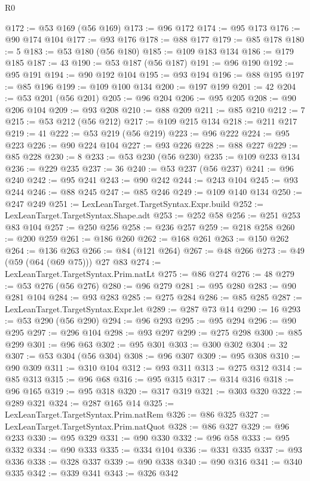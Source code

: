 \begin{lexlean}{R0}
\begin{coremodule}
@172 := @53 @169 (@56 @169)
@173 := @96 @172
@174 := @95 @173
@176 := @90 @174 @104
@177 := @93 @176
@178 := @88 @177
@179 := @85 @178
@180 := 5
@183 := @53 @180 (@56 @180)
@185 := @109 @183 @134
@186 := @179 @185
@187 := 43
@190 := @53 @187 (@56 @187)
@191 := @96 @190
@192 := @95 @191
@194 := @90 @192 @104
@195 := @93 @194
@196 := @88 @195
@197 := @85 @196
@199 := @109 @100 @134
@200 := @197 @199
@201 := 42
@204 := @53 @201 (@56 @201)
@205 := @96 @204
@206 := @95 @205
@208 := @90 @206 @104
@209 := @93 @208
@210 := @88 @209
@211 := @85 @210
@212 := 7
@215 := @53 @212 (@56 @212)
@217 := @109 @215 @134
@218 := @211 @217
@219 := 41
@222 := @53 @219 (@56 @219)
@223 := @96 @222
@224 := @95 @223
@226 := @90 @224 @104
@227 := @93 @226
@228 := @88 @227
@229 := @85 @228
@230 := 8
@233 := @53 @230 (@56 @230)
@235 := @109 @233 @134
@236 := @229 @235
@237 := 36
@240 := @53 @237 (@56 @237)
@241 := @96 @240
@242 := @95 @241
@243 := @90 @242
@244 := @243 @104
@245 := @93 @244
@246 := @88 @245
@247 := @85 @246
@249 := @109 @140 @134
@250 := @247 @249
@251 := LexLeanTarget.TargetSyntax.Expr.build
@252 := LexLeanTarget.TargetSyntax.Shape.adt
@253 := @252 @58
@256 := @251 @253 @83 @104
@257 := @250 @256
@258 := @236 @257
@259 := @218 @258
@260 := @200 @259
@261 := @186 @260
@262 := @168 @261
@263 := @150 @262
@264 := @136 @263
@266 := @84 (@121 @264)
@267 := @48 @266
@273 := @49 (@59 (@64 (@69 @75))) @27 @83
@274 := LexLeanTarget.TargetSyntax.Prim.natLt
@275 := @86 @274
@276 := 48
@279 := @53 @276 (@56 @276)
@280 := @96 @279
@281 := @95 @280
@283 := @90 @281 @104
@284 := @93 @283
@285 := @275 @284
@286 := @85 @285
@287 := LexLeanTarget.TargetSyntax.Expr.let
@289 := @287 @73 @14
@290 := 16
@293 := @53 @290 (@56 @290)
@294 := @96 @293
@295 := @95 @294
@296 := @90 @295
@297 := @296 @104
@298 := @93 @297
@299 := @275 @298
@300 := @85 @299
@301 := @96 @63
@302 := @95 @301
@303 := @300 @302
@304 := 32
@307 := @53 @304 (@56 @304)
@308 := @96 @307
@309 := @95 @308
@310 := @90 @309
@311 := @310 @104
@312 := @93 @311
@313 := @275 @312
@314 := @85 @313
@315 := @96 @68
@316 := @95 @315
@317 := @314 @316
@318 := @96 @165
@319 := @95 @318
@320 := @317 @319
@321 := @303 @320
@322 := @289 @321
@324 := @287 @165 @14
@325 := LexLeanTarget.TargetSyntax.Prim.natRem
@326 := @86 @325
@327 := LexLeanTarget.TargetSyntax.Prim.natQuot
@328 := @86 @327
@329 := @96 @233
@330 := @95 @329
@331 := @90 @330
@332 := @96 @58
@333 := @95 @332
@334 := @90 @333
@335 := @334 @104
@336 := @331 @335
@337 := @93 @336
@338 := @328 @337
@339 := @90 @338
@340 := @90 @316
@341 := @340 @335
@342 := @339 @341
@343 := @326 @342

\end{coremodule}
\end{lexlean}
